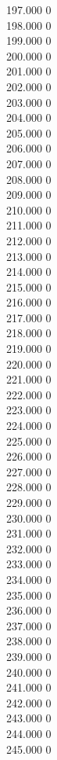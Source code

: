 { 197.000	0 \\
 198.000	0 \\
 199.000	0 \\
 200.000	0 \\
 201.000	0 \\
 202.000	0 \\
 203.000	0 \\
 204.000	0 \\
 205.000	0 \\
 206.000	0 \\
 207.000	0 \\
 208.000	0 \\
 209.000	0 \\
 210.000	0 \\
 211.000	0 \\
 212.000	0 \\
 213.000	0 \\
 214.000	0 \\
 215.000	0 \\
 216.000	0 \\
 217.000	0 \\
 218.000	0 \\
 219.000	0 \\
 220.000	0 \\
 221.000	0 \\
 222.000	0 \\
 223.000	0 \\
 224.000	0 \\
 225.000	0 \\
 226.000	0 \\
 227.000	0 \\
 228.000	0 \\
 229.000	0 \\
 230.000	0 \\
 231.000	0 \\
 232.000	0 \\
 233.000	0 \\
 234.000	0 \\
 235.000	0 \\
 236.000	0 \\
 237.000	0 \\
 238.000	0 \\
 239.000	0 \\
 240.000	0 \\
 241.000	0 \\
 242.000	0 \\
 243.000	0 \\
 244.000	0 \\
 245.000	0 \\
}
